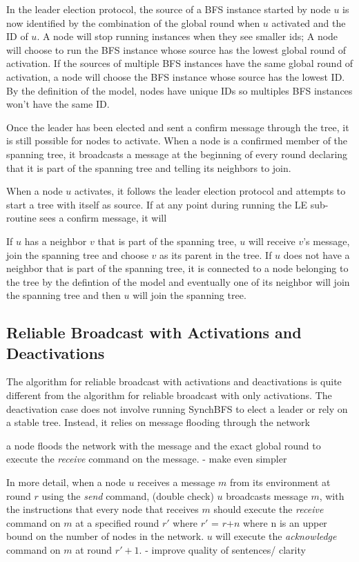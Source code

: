 \documentclass[english]{article}
\begin{document}
In the leader election protocol, the source of a BFS instance started by node $u$ is now identified by the combination of the global round when $u$ activated and the ID of $u$. A node will stop running instances when they see smaller ids; A node will choose to run the BFS instance whose source has the lowest global round of activation. If the sources of multiple BFS instances have the same global round of activation, a node will choose the BFS instance whose source has the lowest ID. By the definition of the model, nodes have unique IDs so multiples BFS instances won't have the same ID.

Once the leader has been elected and sent a confirm message through the tree, it is still possible for nodes to activate. When a node is a confirmed member of the spanning tree, it broadcasts a message at the beginning of every round declaring that it is part of the spanning tree and telling its neighbors to join. 

When a node $u$ activates, it follows the leader election protocol and attempts to start a tree with itself as source. If at any point during running the LE sub-routine sees a confirm message, it will


If $u$ has a neighbor $v$ that is part of the spanning tree, $u$ will receive $v$'s message, join the spanning tree and choose $v$ as its parent in the tree. If $u$ does not have a neighbor that is part of the spanning tree, it is connected to a node belonging to the tree by the defintion of the model and eventually one of its neighbor will join the spanning tree and then $u$ will join the spanning tree.


  \subsection {Reliable Broadcast with Activations and Deactivations}

The algorithm for reliable broadcast with activations and deactivations is quite different from the algorithm for reliable broadcast with only activations. The deactivation case does not involve running SynchBFS to elect a leader or rely on a stable tree. Instead, it relies on message flooding through the network


a node floods the network with the message and the exact global round to execute the \textit{receive} command on the message. - make even simpler


In more detail, when a node $u$ receives a message $m$ from its environment at round $r$ using the \textit{send} command, (double check) $u$ broadcasts message $m$, with the instructions that every node that receives $m$ should execute the \textit{receive} command on $m$ at a specified round $r'$ where $r'$ = $r$+$n$ where n is an upper bound on the number of nodes in the network. $u$ will execute the \textit{acknowledge} command on $m$ at round $r' + 1$. - improve quality of sentences/ clarity
\end{document}

